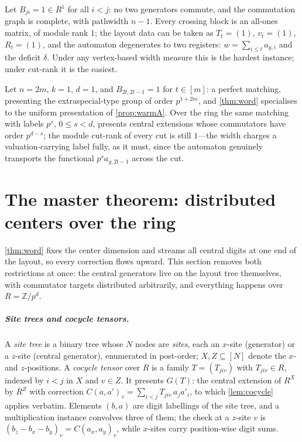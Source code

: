 \documentclass[a4paper,UKenglish,autoref,anonymous]{lipics-v2021}
\newcommand{\ZZ}{\mathbb{Z}}
\newcommand{\R}{R}                                   %
\begin{document}
\begin{example}
\label{ex:clique}
Let $B_{ji} = 1 \in \R^1$ for all $i < j$: no two generators commute,
and the commutation graph is complete, with pathwidth $n - 1$. Every
crossing block is an all-ones matrix, of module rank $1$; the layout
data can be taken as $T_t = (1)$, $v_t = (1)$, $R_t = (1)$, and the
automaton degenerates to two registers: $w = \sum_{i \le t} a_{y,i}$ and
the deficit $\delta$. Under any vertex-based width measure this is the
hardest instance; under cut-rank it is the easiest.
\end{example}

\begin{example}
\label{ex:extraspecial}
Let $n = 2m$, $k = 1$, $d = 1$, and $B_{2t,2t-1} = 1$ for $t \in [m]$: a
perfect matching, presenting the extraspecial-type group of order
$p^{1+2m}$, and \autoref{thm:word} specialises to the uniform
presentation of \autoref{prop:warmA}. Over the ring the same matching
with labels $p^s$, $0 \le s < d$, presents central extensions whose
commutators have order $p^{d-s}$; the module cut-rank of every cut is
still $1$---the width charges a valuation-carrying label fully, as it
must, since the automaton genuinely transports the functional $p^s
a_{y,2t-1}$ across the cut.
\end{example}

\section{The master theorem: distributed centers over the ring}
\label{sec:master}

\autoref{thm:word} fixes the center dimension and streams all central
digits at one end of the layout, so every correction flows upward. This
section removes both restrictions at once: the central generators live on
the layout tree themselves, with commutator targets distributed
arbitrarily, and everything happens over $\R = \ZZ/p^d$.

\subparagraph*{Site trees and cocycle tensors.}
A \emph{site tree} is a binary tree whose $N$ nodes are \emph{sites},
each an $x$-site (generator) or a $z$-site (central generator),
enumerated in post-order; $X, Z \subseteq [N]$ denote the $x$- and
$z$-positions. A \emph{cocycle tensor} over $\R$ is a family $T =
(T_{jiv})$ with $T_{jiv} \in \R$, indexed by $i < j$ in $X$ and $v \in
Z$. It presents $G(T)$: the central extension of $\R^X$ by $\R^Z$ with
correction $C(a, a')_v = \sum_{i<j} T_{jiv}\, a_j a'_i$, to which
\autoref{lem:cocycle} applies verbatim. Elements $(b, a)$ are digit
labellings of the site tree, and a multiplication instance convolves
three of them; the check at a $z$-site $v$ is $(b_z - b_x - b_y)_v =
C(a_x, a_y)_v$, while $x$-sites carry position-wise digit sums.
\end{document}
